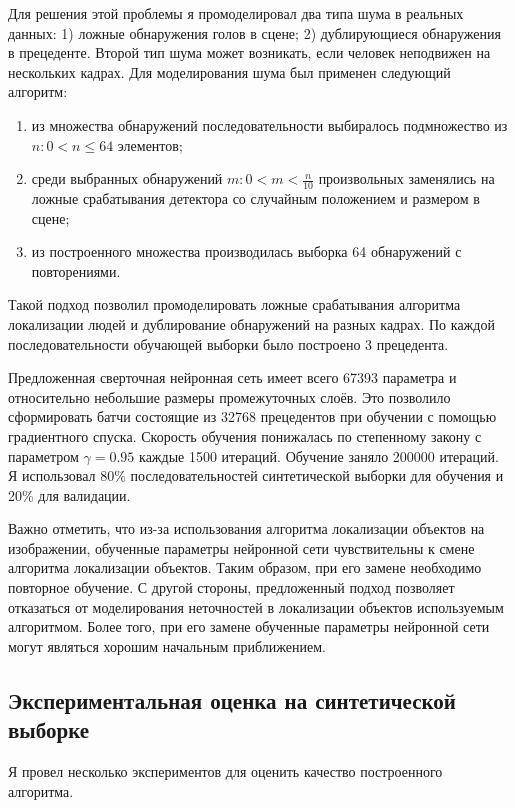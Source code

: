 Для решения этой проблемы я промоделировал два типа шума в реальных данных: 1) ложные обнаружения голов в сцене; 2) дублирующиеся обнаружения в прецеденте. Второй тип шума может возникать, если человек неподвижен на нескольких кадрах. Для моделирования шума был применен следующий алгоритм:
\begin{enumerate}
	\item из множества обнаружений последовательности выбиралось подмножество из $n: 0 < n \le 64$ элементов;
	\item среди выбранных обнаружений $m: 0 < m < \frac{n}{10}$ произвольных заменялись на ложные срабатывания детектора со случайным положением и размером в сцене;
	\item из построенного множества производилась выборка 64 обнаружений с повторениями.
\end{enumerate}

Такой подход позволил промоделировать ложные срабатывания алгоритма локализации людей и дублирование обнаружений на разных кадрах. По каждой последовательности обучающей выборки было построено 3 прецедента.

Предложенная сверточная нейронная сеть имеет всего 67393 параметра и относительно небольшие размеры промежуточных слоёв. Это позволило сформировать батчи состоящие из 32768 прецедентов при обучении с помощью градиентного спуска. Скорость обучения понижалась по степенному закону с параметром $\gamma=0.95$ каждые 1500 итераций. Обучение заняло 200000 итераций. Я использовал 80\% последовательностей синтетической выборки для обучения и 20\% для валидации.

Важно отметить, что из-за использования алгоритма локализации объектов на изображении, обученные параметры нейронной сети чувствительны к смене алгоритма локализации объектов. Таким образом, при его замене необходимо повторное обучение.  С другой стороны, предложенный подход позволяет отказаться от моделирования неточностей в локализации объектов используемым алгоритмом. Более того, при его замене обученные параметры нейронной сети могут являться хорошим начальным приближением.

\subsection{Экспериментальная оценка на синтетической выборке}

Я провел несколько экспериментов для оценить качество построенного алгоритма. 


